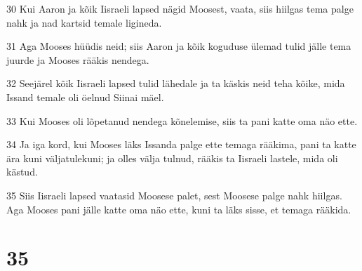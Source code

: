 \par 30 Kui Aaron ja kõik Iisraeli lapsed nägid Moosest, vaata, siis hiilgas tema palge nahk ja nad kartsid temale ligineda.
\par 31 Aga Mooses hüüdis neid; siis Aaron ja kõik koguduse ülemad tulid jälle tema juurde ja Mooses rääkis nendega.
\par 32 Seejärel kõik Iisraeli lapsed tulid lähedale ja ta käskis neid teha kõike, mida Issand temale oli öelnud Siinai mäel.
\par 33 Kui Mooses oli lõpetanud nendega kõnelemise, siis ta pani katte oma näo ette.
\par 34 Ja iga kord, kui Mooses läks Issanda palge ette temaga rääkima, pani ta katte ära kuni väljatulekuni; ja olles välja tulnud, rääkis ta Iisraeli lastele, mida oli kästud.
\par 35 Siis Iisraeli lapsed vaatasid Moosese palet, sest Moosese palge nahk hiilgas. Aga Mooses pani jälle katte oma näo ette, kuni ta läks sisse, et temaga rääkida.

\chapter{35}

